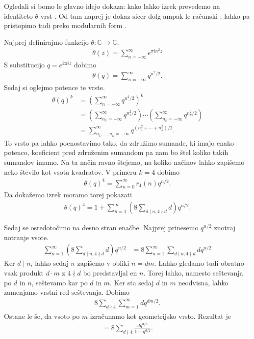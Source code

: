 \begin{dokaz}
    Ogledali si bomo le glavno idejo dokaza: kako lahko izrek prevedemo na identiteto \(\theta\) vrst \cite{kato3}. Od tam naprej je dokaz sicer dolg ampak le računski \cite{Hirschhorn_1982}; lahko pa pristopimo tudi preko modularnih form \cite{kato3}.

    Najprej definirajmo funkcijo \(\theta\colon \mathbb C \to \mathbb C\).
    \begin{align*}
        \theta(z) = \sum_{n=-\infty}^\infty e^{\pi i n^2 z}
    \end{align*}
    S substitucijo \(q = e^{2\pi i z}\) dobimo
    \begin{align*}
        \theta(q) = \sum_{n=-\infty}^\infty q^{n^2/2}.
    \end{align*}
    Sedaj si oglejmo potence te vrste.
    \begin{align*}
        \theta(q)^k & = \left(\sum_{n=-\infty}^\infty q^{n^2/2}\right)^k \\
                    & = \left(\sum_{n_1=-\infty}^\infty q^{n_1^2/2}\right) \cdots \left(\sum_{n_k=-\infty}^\infty q^{n_k^2/2}\right) \\
                    & = \sum_{n_1, \ldots, n_k = -\infty}^\infty q^{(n_1^2 + \cdots + n_k^2)/2}.
    \end{align*}
    To vrsto pa lahko poenostavimo tako, da združimo sumande, ki imajo enako potenco, koeficient pred združenim sumandom pa nam bo štel koliko takih sumandov imamo. Na ta način ravno štejemo, na koliko načinov lahko zapišemo neko število kot vsota kvadratov. V primeru \(k=4\) dobimo
    \begin{align*}
        \theta(q)^4 = \sum_{n=0}^\infty r_4(n) q^{n/2}.
    \end{align*}
    Da dokažemo izrek moramo torej pokazati
    \begin{align*}
        \theta(q)^4 = 1+\sum_{n=1}^\infty \left(8\sum_{d\mid n, 4\nmid d} d \right) q^{n/2}.
    \end{align*}

    Sedaj se osredotočimo na desno stran enačbe. Najprej prinesemo \(q^{n/2}\) znotraj notranje vsote.
    \begin{align*}
        \sum_{n=1}^\infty \left(8\sum_{d\mid n, 4\nmid d} d \right) q^{n/2} & =  8\sum_{n=1}^\infty \sum_{d\mid n, 4\nmid d} d  q^{n/2}
    \end{align*}
    Ker \(d \mid n\), lahko sedaj \(n\) zapišemo v obliki \(n = dm\). Lahko gledamo tudi obratno -- vsak produkt \(d\cdot m\) z \(4\nmid d\) bo predstavljal en \(n\). Torej lahko, namesto seštevanja po \(d\) in \(n\), seštevamo kar po \(d\) in \(m\). Ker sta sedaj \(d\) in \(m\) neodvisna, lahko zamenjamo vrstni red seštevanja. Dobimo
    \begin{align*}
        8\sum_{d\nmid 4} \sum_{m = 1}^\infty d  q^{dm/2}.
    \end{align*}
    Ostane le še, da vsoto po \(m\) izračunamo kot geometrijsko vrsto. Rezultat je
    \begin{align*}
        = 8\sum_{d\nmid 4} \frac{d q^{d/2}}{1-q^{d/2}}.
    \end{align*}


\end{dokaz}
